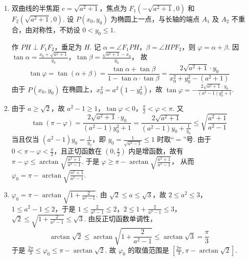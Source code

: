 \documentclass[UTF8,a4paper,oneside,11pt]{ctexbook}
\begin{document}
\begin{solution}
\begin{enumerate}
\item 双曲线的半焦距 \(c = \sqrt{a^2 + 1}\)，焦点为 \(F_1(-\sqrt{a^2 + 1},0)\) 和 \(F_2(\sqrt{a^2 + 1},0)\). 设 \(P(x_0,y_0)\) 为椭圆上一点，与长轴的端点 \(A_1\) 及 \(A_2\) 不重合，由对称性，不妨设 \(0 < y_0 \leqslant 1\).

作 \(PH \perp F_1F_2\)，垂足为 \(H\). 记 \(\alpha = \angle F_1PH\)，\(\beta = \angle HPF_2\)，则 \(\varphi = \alpha + \beta\). 因 \(\tan \alpha = \frac{x_0 + \sqrt{a^2 + 1}}{y_0}\)，\(\tan \beta = \frac{\sqrt{a^2 + 1} - x_0}{y_0}\)，
故
\[
\tan \varphi
= \tan(\alpha + \beta)
= \frac{\tan \alpha + \tan \beta}{1 - \tan \alpha \cdot \tan \beta}
= \frac{2\sqrt{a^2 + 1} \cdot y_0}{x_0^2 + y_0^2 - (a^2 + 1)}
\]
由于 \(P(x_0,y_0)\) 在椭圆上，\(x_0^2 = a^2(1 - y_0^2)\)，故 \(\tan \varphi = -\frac{2\sqrt{a^2 + 1} \cdot y_0}{(a^2 - 1)y_0^2 + 1}\).

\item 由于 \(a \geqslant \sqrt{2}\)，故 \(a^2 - 1 \geqslant 1\)，\(\tan \varphi < 0\)，\(\frac{\pi}{2} < \varphi < \pi\). 又
\[
\tan(\pi - \varphi)
= \frac{2\sqrt{a^2 + 1} \cdot y_0}{(a^2 - 1)y_0^2 + 1}
= \frac{2\sqrt{a^2 + 1}}{(a^2 - 1)y_0 + \frac{1}{y_0}}
\leqslant \sqrt{\frac{a^2 + 1}{a^2 - 1}}
\]
当且仅当 \((a^2 - 1)y_0 = \frac{1}{y_0}\)，即 \(y_0 = \frac{1}{\sqrt{a^2 - 1}} \leqslant 1\) 时取“\(=\)”号. 由于 \(0 < \pi - \varphi < \frac{\pi}{2}\)，且正切函数在 \(\left(0,\frac{\pi}{2}\right)\) 内是增函数，故有 \(\pi - \varphi \leqslant \arctan\sqrt{\frac{a^2 + 1}{a^2 - 1}}\).
于是 \(\varphi \geqslant \pi - \arctan\sqrt{\frac{a^2 + 1}{a^2 - 1}}\)，
从而 \(\varphi_0 = \pi - \arctan\sqrt{\frac{a^2 + 1}{a^2 - 1}}\).

\item \(\varphi_0 = \pi - \arctan\sqrt{1 + \frac{2}{a^2 - 1}}\). 由 \(\sqrt{2} \leqslant a \leqslant \sqrt{3}\)，故 \(2 \leqslant a^2 \leqslant 3\)，\(1 \leqslant a^2 - 1 \leqslant 2\)，于是
\(1 \leqslant \frac{2}{a^2 - 1} \leqslant 2\)，\(2 \leqslant 1 + \frac{2}{a^2 - 1} \leqslant 3\)，
\(\sqrt{2} \leqslant \sqrt{1 + \frac{2}{a^2 - 1}} \leqslant \sqrt{3}\).
由反正切函数单调性，
\[
\arctan\sqrt{2} \leqslant \arctan\sqrt{1 + \frac{2}{a^2 - 1}} \leqslant \arctan\sqrt{3} = \frac{\pi}{3}
\]
于是 \(\frac{2\pi}{3} \leqslant \varphi_0 \leqslant \pi - \arctan\sqrt{2}\).
故 \(\varphi_0\) 的取值范围是 \(\left[\frac{2\pi}{3}, \pi - \arctan\sqrt{2}\right]\).

\end{enumerate}
\end{solution}

\end{document}
